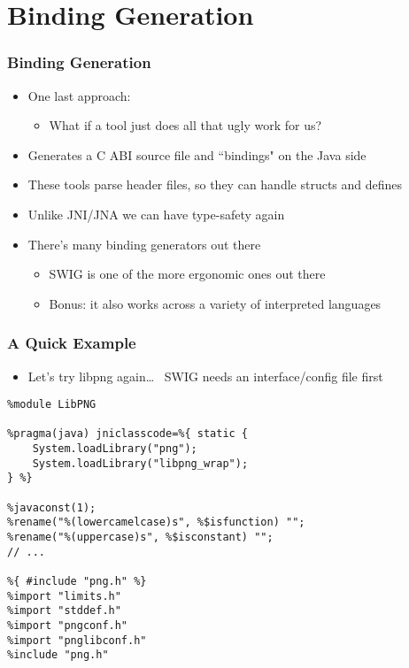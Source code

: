 \documentclass[10pt,mathserif]{beamer}
\begin{document}
	\section{Binding Generation}

	\begin{frame}
		\frametitle{Binding Generation}

		\begin{itemize}
			\item One last approach:
			\begin{itemize}
				\item What if a tool just does all that ugly work for us?
			\end{itemize}
			\item Generates a C ABI source file and ``bindings" on the Java side
			\item These tools parse header files, so they can handle structs and defines
			\item Unlike JNI/JNA we can have type-safety again
			\item There's many binding generators out there
			\begin{itemize}
				\item SWIG is one of the more ergonomic ones out there
				\item Bonus: it also works across a variety of interpreted languages
			\end{itemize}
		\end{itemize}
	\end{frame}

	\begin{frame}[fragile]
		\frametitle{A Quick Example}

		\begin{itemize}
			\item Let's try libpng again\dots~ SWIG needs an interface/config file first
		\end{itemize}

		\begin{lstlisting}
%module LibPNG

%pragma(java) jniclasscode=%{ static {
	System.loadLibrary("png");
	System.loadLibrary("libpng_wrap");
} %}

%javaconst(1);
%rename("%(lowercamelcase)s", %$isfunction) "";
%rename("%(uppercase)s", %$isconstant) "";
// ...

%{ #include "png.h" %}
%import "limits.h"
%import "stddef.h"
%import "pngconf.h"
%import "pnglibconf.h"
%include "png.h"
		\end{lstlisting}
	\end{frame}
\end{document}

